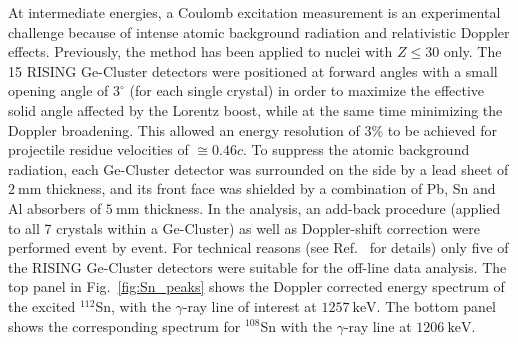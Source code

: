 \documentclass[prc,twocolumn,amssymb,amsmath,showpacs,superscriptaddress]{revtex4}
\begin{document}
At intermediate energies, a Coulomb excitation measurement is an
experimental challenge because of intense atomic background
radiation and relativistic Doppler effects. Previously, the method
has been applied to nuclei with $Z \leq 30$ only. The 15 RISING
Ge-Cluster detectors were positioned at forward angles with a
small opening angle of $3^{\circ}$ (for each single crystal) in
order to maximize the effective solid angle affected by the
Lorentz boost, while at the same time minimizing the Doppler
broadening. This allowed an energy resolution of $3 \%$ to be
achieved for projectile residue velocities of $\cong 0.46 c$. To
suppress the atomic background radiation, each Ge-Cluster detector
was surrounded on the side by a lead sheet of $2\ \text{mm}$
thickness, and its front face was shielded by a combination of Pb,
Sn and Al absorbers of $5\ \text{mm}$ thickness. In the analysis,
an add-back procedure (applied to all 7 crystals within a
Ge-Cluster) as well as Doppler-shift correction were performed
event by event. For technical reasons (see Ref.~\cite{ban05} for
details) only five of the RISING Ge-Cluster detectors were
suitable for the off-line data analysis. The top panel in
Fig.~\ref{fig:Sn_peaks} shows the Doppler corrected energy
spectrum of the excited $^{112}$Sn, with the $\gamma$-ray line of
interest at $1257\ \text{keV}$.  The bottom panel shows the
corresponding spectrum for $^{108}$Sn with the $\gamma$-ray line
at $1206\ \text{keV}$.
\end{document}
